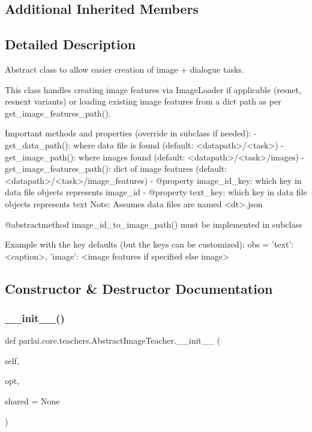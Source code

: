 \subsection*{Additional Inherited Members}


\subsection{Detailed Description}
\begin{DoxyVerb}Abstract class to allow easier creation of image + dialogue tasks.

This class handles creating image features via ImageLoader if applicable
(resnet, resnext variants) or loading existing image features from a dict
path as per get_image_features_path().

Important methods and properties (override in subclass if needed):
- get_data_path(): where data file is found (default: <datapath>/<task>)
- get_image_path(): where images found (default: <datapath>/<task>/images)
- get_image_features_path(): dict of image features (default:
  <datapath>/<task>/image_features)
- @property image_id_key: which key in data file objects represents image_id
- @property text_key: which key in data file objects represents text
Note: Assumes data files are named <dt>.json

@abstractmethod image_id_to_image_path() must be implemented in
subclass

Example with the key defaults (but the keys can be customized):
obs = {'text': <caption>,
    'image': <image features if specified else image>
    }
\end{DoxyVerb}
 

\subsection{Constructor \& Destructor Documentation}
\mbox{\label{classparlai_1_1core_1_1teachers_1_1AbstractImageTeacher_aab36cededc1817fee5109293bd62c51d}} 
\subsubsection{\texorpdfstring{\+\_\+\+\_\+init\+\_\+\+\_\+()}{\_\_init\_\_()}}
{\footnotesize\ttfamily def parlai.\+core.\+teachers.\+Abstract\+Image\+Teacher.\+\_\+\+\_\+init\+\_\+\+\_\+ (\begin{DoxyParamCaption}\item[{}]{self,  }\item[{}]{opt,  }\item[{}]{shared = {\ttfamily None} }\end{DoxyParamCaption})}



